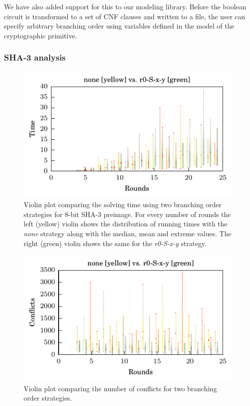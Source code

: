 We have also added support for this to our modeling library.
Before the boolean circuit is transformed to a set of CNF clauses and written to a file, the user can specify arbitrary branching order using variables defined in the model of the cryptographic primitive.


\subsubsection{SHA-3 analysis}
\begin{figure}
\centering \includegraphics{figures/bo-ex1/sbs-time-none-r0sxy.pdf}
\caption{Violin plot comparing the solving time using two branching order strategies for $8$-bit SHA-3 preimage. For every number of rounds the left (yellow) violin shows the distribution of running times with the \emph{none} strategy along with the median, mean and extreme values. The right (green) violin shows the same for the \emph{r0-S-x-y} strategy.}
\label{fig:bo-sbs-time-none-r0sxy}
\end{figure}

\begin{figure}
\centering \includegraphics{figures/bo-ex1/sbs-confl-none-r0sxy.pdf}
\caption{Violin plot comparing the number of conflicts for two branching order strategies.}
\label{fig:bo-sbs-confl-none-r0sxy}
\end{figure}

